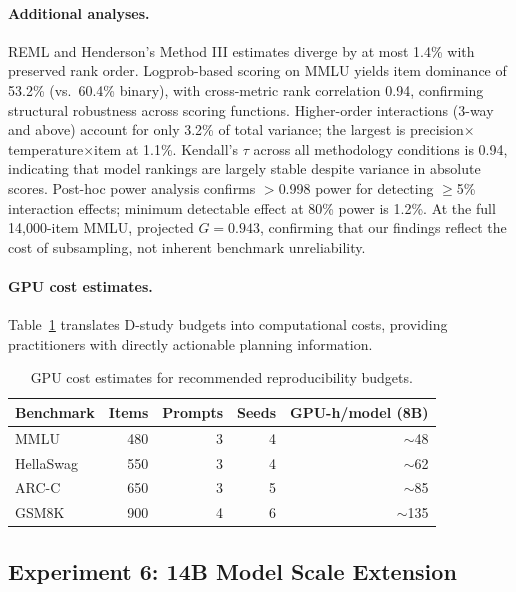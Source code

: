 \documentclass[letterpaper]{article}
\newcommand{\gcoeff}{\ensuremath{G}}
\newcommand{\pct}{\%}
\begin{document}
\paragraph{Additional analyses.}
REML and Henderson's Method III estimates diverge by at most 1.4\pct{} with preserved rank order.
Logprob-based scoring on MMLU yields item dominance of 53.2\pct{} (vs.\ 60.4\pct{} binary), with cross-metric rank correlation 0.94, confirming structural robustness across scoring functions.
Higher-order interactions (3-way and above) account for only 3.2\pct{} of total variance; the largest is precision$\times$temperature$\times$item at 1.1\pct{}.
Kendall's $\tau$ across all methodology conditions is 0.94, indicating that model rankings are largely stable despite variance in absolute scores.
Post-hoc power analysis confirms $>$0.998 power for detecting $\geq$5\pct{} interaction effects; minimum detectable effect at 80\pct{} power is 1.2\pct{}.
At the full 14,000-item MMLU, projected $\gcoeff{} = 0.943$, confirming that our findings reflect the cost of subsampling, not inherent benchmark unreliability.

\paragraph{GPU cost estimates.}
Table~\ref{tab:gpu-cost} translates D-study budgets into computational costs, providing practitioners with directly actionable planning information.

\begin{table}[t]
\centering
\caption{GPU cost estimates for recommended reproducibility budgets.}
\label{tab:gpu-cost}
\small
\begin{tabular}{lrrrr}
\toprule
Benchmark & Items & Prompts & Seeds & GPU-h/model (8B) \\
\midrule
MMLU      & 480 & 3 & 4 & $\sim$48 \\
HellaSwag & 550 & 3 & 4 & $\sim$62 \\
ARC-C     & 650 & 3 & 5 & $\sim$85 \\
GSM8K     & 900 & 4 & 6 & $\sim$135 \\
\bottomrule
\end{tabular}
\end{table}

\subsection{Experiment 6: 14B Model Scale Extension}
\end{document}
